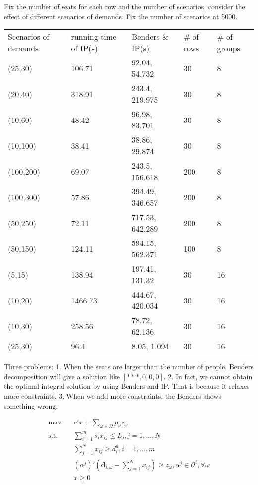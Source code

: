 Fix the number of seats for each row and the number of scenarios, consider the effect of different scenarios of demands. Fix the number of scenarios at 5000.


\begin{table}[ht]
  \begin{tabular}{l|l|l|l|l}
  \hline
  Scenarios of demands & running time of IP(s) & Benders \& IP(s) & \# of rows & \# of groups \\
  (25,30)  & 106.71 & 92.04, 54.732 & 30 & 8 \\
  (20,40)  & 318.91 & 243.4, 219.975 & 30 & 8 \\
  (10,60)  & 48.42  & 96.98, 83.701 & 30 & 8 \\
  (10,100) & 38.41  & 38.86, 29.874 & 30 & 8 \\
  \hline
  (100,200) & 69.07 & 243.5, 156.618 & 200 & 8 \\
  (100,300) & 57.86 & 394.49, 346.657 & 200 & 8 \\
  (50,250) & 72.11  & 717.53, 642.289 & 200 & 8 \\
  (50,150) & 124.11  & 594.15, 562.371 & 100 & 8 \\
  \hline
  (5,15)   & 138.94  & 197.41, 131.32 & 30 & 16  \\
  (10,20)  & 1466.73 & 444.67, 420.034 & 30 & 16  \\
  (10,30)  & 258.56 & 78.72, 62.136 & 30 & 16  \\
  (25,30)  & 96.4  & 8.05, 1.094 & 30 & 16  \\
  \hline
  \end{tabular}
\end{table}

Three problems:
1. When the seats are larger than the number of people, Benders decomposition will give a solution like $[***,0,0,0]$.
2. In fact, we cannot obtain the optimal integral solution by using Benders and IP. That is because it relaxes more constraints.
3. When we add more constraints, the Benders shows something wrong.

\begin{equation}\label{BD_demands}
  \begin{aligned}
    \max \quad & c{'} x + \sum_{\omega \in \Omega} p_{\omega} z_{\omega} \\
    \text {s.t.} \quad & \sum_{i = 1}^{m} s_i x_{ij} \leq L_{j}, j=1,\ldots,N \\
    & \sum_{j =1}^{N} x_{ij} \geq d_{i}^{a}, i=1,\ldots,m \\
    & (\alpha^{j}){'}(\mathbf{d}_{i,\omega}- \sum_{j=1}^{N} x_{ij}) \geq z_{\omega}, \alpha^j \in \mathcal{O}^{t}, \forall \omega \\
     & x \geq 0
  \end{aligned}
\end{equation}

